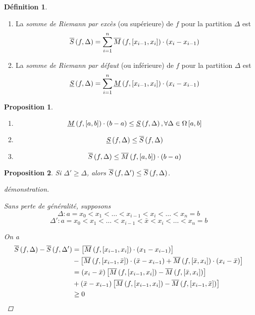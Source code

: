 \documentclass{report}
\newtheorem*{prop}{Proposition}
\theoremstyle{definition}
\newtheorem*{defin}{D\'efinition}
\theoremstyle{remark}
\begin{document}
	\begin{defin}
		~

		\begin{enumerate}[label=\alph*)]
			\item La \emph{somme de Riemann par exc\`es} (ou sup\'erieure) de $f$ pour la partition $\Delta$ est
			\[
			\ssup{f}= \displaystyle\sum_{i=1}^{n}\msup{f}[x_{i-1},x_i] \cdot (x_i-x_{i-1})
			\]
			\item La \emph{somme de Riemann par d\'efaut} (ou inf\'erieure) de $f$ pour la partition $\Delta$ est
			\[
			\sinf{f}= \displaystyle\sum_{i=1}^{n}\minf{f}[x_{i-1},x_i] \cdot (x_i-x_{i-1})
			\]
		\end{enumerate}
	\end{defin}

	\newpage
	\begin{prop}
		~

		\begin{enumerate}[label=\alph*)]
			\item
			\[
			\minf{f} \cdot (b-a) \leq \sinf{f}, \forall\Delta\in\partitions
			\]
			\item
			\[
			\sinf{f} \leq \ssup{f}
			\]
			\item
			\[
			\ssup{f} \leq \msup{f} \cdot (b-a)
			\]
		\end{enumerate}
	\end{prop}

	\begin{prop}
		Si $\Delta'\geq\Delta$, alors $\ssup{f}[\Delta']\leq\ssup{f}$.
		\begin{proof}[d\'emonstration]~

			Sans perte de g\'en\'eralit\'e, supposons
			\[
			\Delta:a=x_0<x_1<\dotsc<x_{i-1}<x_i<\dotsc<x_n=b
			\]
			\[
			\Delta':a=x_0<x_1<\dotsc<x_{i-1}<\bar{x}<x_i<\dotsc<x_n=b
			\]

			On a
			\begin{align*}
				\ssup{f}-\ssup{f}[\Delta']&= \left[ \msup{f}[x_{i-1},x_i] \cdot (x_1-x_{i-1}) \right]\\
				&- \left[ \msup{f}[x_{i-1},\bar{x}] \cdot (\bar{x}-x_{i-1}) + \msup{f}[\bar{x},x_i] \cdot (x_i-\bar{x}) \right]\\
				&= (x_i-\bar{x}) \left[ \msup{f}[x_{i-1},x_i] - \msup{f}[\bar{x},x_i] \right]\\
				&+ (\bar{x}-x_{i-1}) \left[ \msup{f}[x_{i-1},x_i] - \msup{f}[x_{i-1},\bar{x}] \right]\\
				&\geq 0
			\end{align*}
		\end{proof}
	\end{prop}
\end{document}
